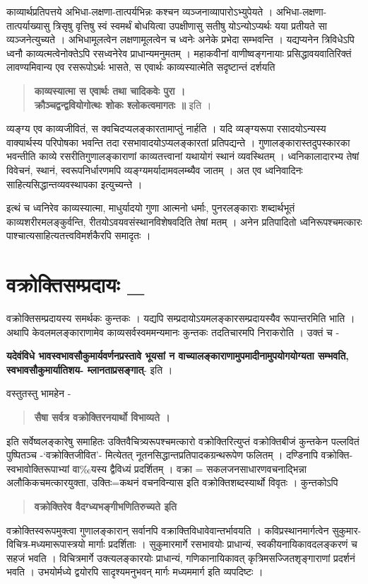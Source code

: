 {काव्यार्थप्रतिपत्तये अभिधा-लक्षणा-तात्पर्यभिन्नः कश्चन व्यञ्जनाव्यापारोऽभ्युपेयते । अभिधा-लक्षणा-तात्पर्याख्यासु त्रिसृषु वृत्तिषु स्वं स्वमर्थं बोधयित्वा उपक्षीणासु सतीषु योऽन्योऽप्यर्थः यया प्रतीयते सा व्यञ्जनेत्युच्यते । अभिधामूलत्वेन लक्षणामूलत्वेन च ध्वनेः अनेके प्रभेदा सम्भवन्ति । यद्यप्यनेन त्रिविधेऽपि ध्वनौ काव्यत्मत्वेनोक्तेऽपि रसध्वनेरेव प्राधान्यमनुमतम् । महाकवीनां वाणीष्वङ्गनायाः प्रसिद्धावयवातिरिक्तं लावण्यमिवान्य एव रसरूपोऽर्थः भासते, स एवार्थः काव्यस्यात्मेति सदृष्टान्तं दर्शयति 

\begin{verse}
\textbf{काव्यस्यात्मा स एवार्थः तथा चादिकवेः पुरा ।\\
क्रौञ्चद्वन्द्ववियोगोत्थः शोकः श्लोकत्वमागतः ॥} इति ।
\end{verse}
व्यङ्ग्य एव काव्यजीवितं, स क्वचिदप्यलङ्कारतामाप्तुं नार्हति । यदि व्यङ्ग्यरूपा रसादयोऽन्यस्य वाक्यार्थस्य परिपोषका भवन्ति तदा रसभावादयोऽप्यलङ्कारतां प्रतिपद्यन्ते । गुणालङ्कारास्तदुपस्कारका भवन्तीति काव्ये रसरीतिगुणालङ्काराणां काव्यतत्त्वानां यथायोगं स्थानं व्यवस्थितम् । ध्वनिकालादारभ्य तेषां विवेचनं, स्थानं, स्वरूपनिर्धारणमपि व्यङ्ग्यमर्यादामवलम्ब्यैव जातम् । अत एव ध्वनिवादिनः साहित्यसिद्धान्तव्यवस्थापका इत्युच्यन्ते ।

इत्थं च ध्वनिरेव काव्यस्यात्मा, माधुर्यादयो गुणा आत्मनो धर्माः, पुनरलङ्काराः शब्दार्थभूतं काव्यशरीरमलङ्कुर्वन्ति, रीतयोऽवयवसंस्थानविशेषवदिति तेषां मतम् । अनेन प्रतिपादितो ध्वनिरूपश्चमत्कारः पाश्चात्यसाहित्यतत्त्वविमर्शकैरपि समादृतः ।

\section*{ वक्रोक्तिसम्प्रदायः \_} 

वक्रोक्तिसम्प्रदायस्य समर्थकः कुन्तकः । यद्यपि सम्प्रदायोऽयमलङ्कारसम्प्रदायस्यैव रूपान्तरमिति भाति । अथापि केवलमलङ्काराणामेव काव्यसर्वस्वममन्यमानः कुन्तकः तदतिचारमपि निराकरोति । उक्तं च - 

\textbf{यदेवंविधे भावस्वभावसौकुमार्यवर्णनप्रस्तावे भूयसां न वाच्यालङ्काराणामुपमादीनामुपयोगयोग्यता सम्भवति, स्वभावसौ\-कुमार्यातिशय- म्लानताप्रसङ्गात्}- इति । 

वस्तुतस्तु भामहेन - 
\begin{verse}
\textbf{सैषा सर्वत्र वक्रोक्तिरनयार्थो विभाव्यते । }
\end{verse}
इति सर्वेष्वलङ्कारेषु समाहितः उक्तिवैचित्र्यरूपश्चमत्कारो वक्रोक्तिरित्युप्तं वक्रोक्तिबीजं कुन्तकेन पल्लवितं पुष्पितञ्च -‘वक्रोक्तिजीवित’- मित्येतत् नूतनसिद्धान्तप्रतिपादकग्रन्थरूपेण फलितम् । दण्डिनापि वक्रोक्ति-स्वभावोक्तिरूपाभ्यां वा‰यस्य द्वैविध्यं प्रदर्शितम् । वक्रा = सकलजनसाधारणवचनाद्भिन्ना अलौकिकचमत्कारयुक्ता, उक्तिः=कथनं वचनविन्यास इति वक्रोक्तिशब्दस्यार्थो विवृतः । कुन्तकोऽपि
\begin{verse}
\textbf{वक्रोक्तिरेव वैदग्ध्यभङ्गीभणितिरुच्यते इति }
\end{verse}
वक्रोक्तिस्वरूपमुक्त्वा गुणालङ्कारान् सर्वानपि वक्राक्तिविधावेवान्तर्भावयति । कविप्रस्थानमार्गत्वेन सुकुमार-विचित्र-मध्यमारूपास्त्रयो मार्गाः प्रदर्शिताः । सुकुमारमार्गे रसभावयोः प्राधान्यं, स्वकीयनायिकावदलङ्करणं च सहजं भवति । विचित्रमार्गे उक्त्यलङ्कारयोः प्राधान्यं, गणिकानायिकावत् कृत्रिमसज्जितशृङ्गाराणां प्रदर्शनं भवति । उभयोर्मध्ये द्वयोरपि सादृश्यमनुभवन् मार्गः मध्यममार्ग इति व्यपदिष्टः ।

}
